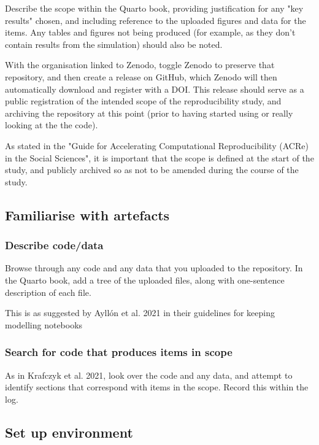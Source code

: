 Describe the scope within the Quarto book, providing justification for any "key results" chosen, and including reference to the uploaded figures and data for the items. Any tables and figures not being produced (for example, as they don't contain results from the simulation) should also be noted.

With the organisation linked to Zenodo, toggle Zenodo to preserve that repository, and then create a release on GitHub, which Zenodo will then automatically download and register with a DOI. This release should serve as a public registration of the intended scope of the reproducibility study, and archiving the repository at this point (prior to having started using or really looking at the the code).

As stated in the "Guide for Accelerating Computational Reproducibility (ACRe) in the Social Sciences", it is important that the scope is defined at the start of the study, and publicly archived so as not to be amended during the course of the study.\cite{berkeley_initiative_for_transparency_in_the_social_sciences_guide_2022}

\subsection{Familiarise with artefacts}

\subsubsection{Describe code/data}
\timeyes

Browse through any code and any data that you uploaded to the repository. In the Quarto book, add a tree of the uploaded files, along with one-sentence description of each file.

This is as suggested by Ayllón et al. 2021\autocite{ayllon_keeping_2021} in their guidelines for keeping modelling notebooks

\subsubsection{Search for code that produces items in scope}
\timeyes

As in Krafczyk et al. 2021,\cite{krafczyk_learning_2021} look over the code and any data, and attempt to identify sections that correspond with items in the scope. Record this within the log.

\subsection{Set up environment}

